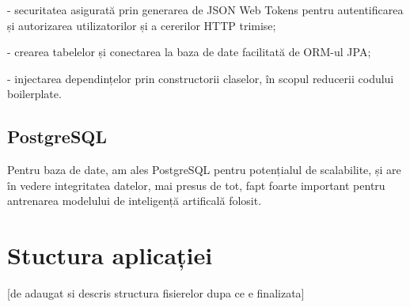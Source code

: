 - securitatea asigurată prin generarea de JSON Web Tokens pentru autentificarea și autorizarea utilizatorilor și a cererilor HTTP trimise;

- crearea tabelelor și conectarea la baza de date facilitată de ORM-ul JPA;

- injectarea dependințelor prin constructorii claselor, în scopul reducerii codului boilerplate.

\subsection{PostgreSQL}

Pentru baza de date, am ales PostgreSQL pentru potențialul de scalabilite, și are în vedere  integritatea datelor, mai presus de tot, fapt foarte important pentru antrenarea modelului de inteligență artificală folosit.

\section{Stuctura aplicației}

[de adaugat si descris structura fisierelor dupa ce e finalizata]